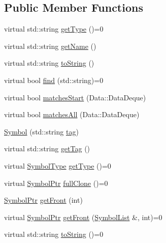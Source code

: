 \subsection*{Public Member Functions}
\begin{DoxyCompactItemize}
\item 
virtual std\+::string \mbox{\hyperlink{class_erable_1_1_compiler_1_1_symbols_1_1_symbol_a63b41d0942e5d65288fa3fc9d466ab43}{get\+Type}} ()=0
\item 
virtual std\+::string \mbox{\hyperlink{class_erable_1_1_compiler_1_1_symbols_1_1_symbol_a71aeae736d2ec43f0880341d53bbcc2c}{get\+Name}} ()
\item 
virtual std\+::string \mbox{\hyperlink{class_erable_1_1_compiler_1_1_symbols_1_1_symbol_af5ccb3fb3201fd88ab6ce0e495416c82}{to\+String}} ()
\item 
virtual bool \mbox{\hyperlink{class_erable_1_1_compiler_1_1_symbols_1_1_symbol_ac1d8b1392aef2e93bd47520a86f8617f}{find}} (std\+::string)=0
\item 
virtual bool \mbox{\hyperlink{class_erable_1_1_compiler_1_1_symbols_1_1_symbol_a108a4a3e9b9a2785f14ed580e813a52a}{matches\+Start}} (Data\+::\+Data\+Deque)
\item 
virtual bool \mbox{\hyperlink{class_erable_1_1_compiler_1_1_symbols_1_1_symbol_a49dd91010baf238ed0d639004c3ec9ba}{matches\+All}} (Data\+::\+Data\+Deque)
\item 
\mbox{\hyperlink{class_erable_1_1_compiler_1_1_symbols_1_1_symbol_ac4118dbed43e0a07dadb08f92bab3c75}{Symbol}} (std\+::string \mbox{\hyperlink{class_erable_1_1_compiler_1_1_symbols_1_1_symbol_a09df8dce9bee3576451b880fc651506d}{tag}})
\item 
virtual std\+::string \mbox{\hyperlink{class_erable_1_1_compiler_1_1_symbols_1_1_symbol_a135ecb3f3ede9d5c5804419da61716b5}{get\+Tag}} ()
\item 
virtual \mbox{\hyperlink{namespace_erable_1_1_compiler_1_1_symbols_a3b60ec10cda0920ec4368128361b8320}{Symbol\+Type}} \mbox{\hyperlink{class_erable_1_1_compiler_1_1_symbols_1_1_symbol_a0ff00b470d72db3b1377fcdc1e3560f8}{get\+Type}} ()=0
\item 
virtual \mbox{\hyperlink{namespace_erable_1_1_compiler_1_1_symbols_a8f0bc762f448ea4d84e8713ab3e140b9}{Symbol\+Ptr}} \mbox{\hyperlink{class_erable_1_1_compiler_1_1_symbols_1_1_symbol_a23ed5c4b948000c29af03c846abc12fc}{full\+Clone}} ()=0
\item 
\mbox{\hyperlink{namespace_erable_1_1_compiler_1_1_symbols_a8f0bc762f448ea4d84e8713ab3e140b9}{Symbol\+Ptr}} \mbox{\hyperlink{class_erable_1_1_compiler_1_1_symbols_1_1_symbol_af9fa113998ec62ef3e67a6d9a1bd417e}{get\+Front}} (int)
\item 
virtual \mbox{\hyperlink{namespace_erable_1_1_compiler_1_1_symbols_a8f0bc762f448ea4d84e8713ab3e140b9}{Symbol\+Ptr}} \mbox{\hyperlink{class_erable_1_1_compiler_1_1_symbols_1_1_symbol_ad9df550a90d6821b73291a241044c163}{get\+Front}} (\mbox{\hyperlink{namespace_erable_1_1_compiler_1_1_symbols_a63e8157d2f729d4689d27bacad42f8ed}{Symbol\+List}} \&, int)=0
\item 
virtual std\+::string \mbox{\hyperlink{class_erable_1_1_compiler_1_1_symbols_1_1_symbol_ad32fcce939908335ae03f020f3a680e8}{to\+String}} ()=0
\end{DoxyCompactItemize}
